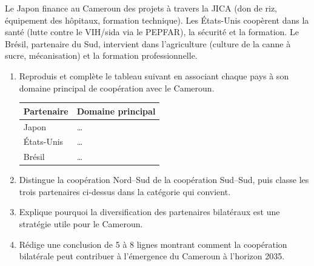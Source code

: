 \documentclass[11pt]{article}
\begin{document}
\begin{exercice}
Le Japon finance au Cameroun des projets à travers la JICA (don de riz, équipement des hôpitaux, formation technique). Les États-Unis coopèrent dans la santé (lutte contre le VIH/sida via le PEPFAR), la sécurité et la formation. Le Brésil, partenaire du Sud, intervient dans l'agriculture (culture de la canne à sucre, mécanisation) et la formation professionnelle.
\begin{enumerate}
\item Reproduis et complète le tableau suivant en associant chaque pays à son domaine principal de coopération avec le Cameroun.

\begin{center}
\begin{tabular}{|l|l|}
\hline
\textbf{Partenaire} & \textbf{Domaine principal} \\
\hline
Japon & \ldots \\
\hline
États-Unis & \ldots \\
\hline
Brésil & \ldots \\
\hline
\end{tabular}
\end{center}

\item Distingue la coopération Nord--Sud de la coopération Sud--Sud, puis classe les trois partenaires ci-dessus dans la catégorie qui convient.
\item Explique pourquoi la diversification des partenaires bilatéraux est une stratégie utile pour le Cameroun.
\item Rédige une conclusion de 5 à 8 lignes montrant comment la coopération bilatérale peut contribuer à l'émergence du Cameroun à l'horizon 2035.
\end{enumerate}
\end{exercice}
\end{document}
